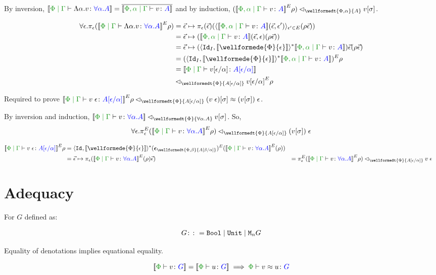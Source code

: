 \documentclass{Report}
\newcommand\eLogRel[4]{\logRel{#2}{\wellformedt{#1}{#3}}{#4}}
\newcommand\peLogRel[3]{\eLogRel{\P}{#1}{#2}{#3}}
\newcommand{\zptyperelation}[2]{\typerelation{\P}{#1}{#2}}
\newcommand{\zpberelation}[2]{\berelation{\P}{#1}{#2}}
\newcommand{\fapply}[0]{^E}
\newcommand{\pe}[0]{\pi_\e}
\begin{document}
\case{\vgen}

By inversion, $\deno{\gpetyperelation{\elam{\a}{v}}{\all{\a}{A}}} = \bar{\deno{\etyperelation{\P,\a}{\G}{v}{A}}}$ and by induction, $\eLogRel{\P,\a}{(\deno{\etyperelation{\P,\a}{\G}{v}{A}}\fapply\rho)}{A}{v\ssi}$.

\begin{align*}
    \forall{\e}. \pe(\deno{\gpetyperelation{\elam{\a}{v}}{\all{\a}{A}}}\fapply\rho)&= \ev \mapsto \pe(\ev)(\finpr{\deno{\etyperelation{\P, \a}{\G}{v}{A}}(\ev, \e')}{\e'\in E}(\rho \ev))\\
    & = \ev \mapsto (\deno{\etyperelation{\P, \a}{\G}{v}{A}}(\ev, \e)(\rho \ev))\\
    & = \ev \mapsto (\pr{\Id{I}}{\deno{\wellformede{\P}{\e}}}\star\deno{\etyperelation{\P,\a}{\G}{v}{A}})\ev (\rho\ev)\\
    & = (\pr{\Id{I}}{\deno{\wellformede{\P}{\e}}}\star\deno{\etyperelation{\P,\a}{\G}{v}{A}})\fapply \rho\\
    & = \deno{\gpetyperelation{v\ssub{\a}{\e}}{A\ssub{\a}{\e}}}\\
    & \relates_{\wellformedt{\P}{A\ssub{\a}{\e}}}{v\ssub{\a}{\e}}\fapply\rho
\end{align*}

\case{\vspec}
Required to prove $\peLogRel{\deno{\gpetyperelation{\eapp{v}{\e}}{A\ssub{\a}{\e}}}\fapply\rho}{A\ssub{\a}{\e}}{(\eapp{v}{\e})\ssi\beequiv\eapp{(v\ssi)}{\e}}$.

By inversion and induction, $\peLogRel{\deno{\gpetyperelation{v}{\all{\a}{A}}}}{\all{\a}{A}}{v\ssi}$. So, $$\forall\e. \peLogRel{\pe\fapply(\deno{\gpetyperelation{v}{\all{\a}{A}}}\fapply\rho)}{A\ssub{\a}{\e}}{\eapp{(v\ssi)}{\e}}$$

\begin{align*}
    \deno{\gpetyperelation{\eapp{v}{\e}}{A\ssub{\a}{\e}}}\fapply\rho & = \pr{\Id{}}{\deno{\wellformede{\P}{\e}}}\star(\counit{\wellformedt{\P,\b}{A\ssub{\a}{\b}}})\fapply(\deno{\gpetyperelation{v}{\all{\a}{A}}}\fapply(\rho))\\
    & = \ev\mapsto\pe(\deno{\gpetyperelation{v}{\all{\a}{A}}}\fapply(\rho)\ev)
    & = \pe\fapply(\deno{\gpetyperelation{v}{\all{\a}{A}}}\fapply\rho)
    & \peLogRel{}{A\ssub{\a}{\e}}{\eapp{v}{\e}}
\end{align*}


\section{Adequacy}
\begin{theorem}[Adequacy]
For $G$ defined as:

\begin{align*}
    G\colon\colon= \texttt{Bool} \mid \texttt{Unit} \mid \texttt{M}_{n}{G}
\end{align*}

Equality of denotations implies equational equality.

\begin{equation}
    \deno{\zptyperelation{v}{G}} = \deno{\zptyperelation{u}{G}} \implies \zpberelation{v}{u}{G}
\end{equation}

\end{theorem}
\end{document}

